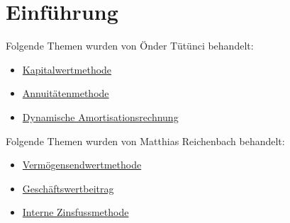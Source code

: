 \chapter{Einführung}
\label{Einfuehrung}

Folgende Themen wurden von Önder Tütünci behandelt:

\begin{itemize}
    \item \hyperref[Kapitalwertmethode]{Kapitalwertmethode}
    \item \hyperref[Annuitaetenmethode]{Annuitätenmethode}
    \item \hyperref[Dynamische Amortisationsrechnung]{Dynamische Amortisationsrechnung}
\end{itemize}
Folgende Themen wurden von Matthias Reichenbach behandelt:

\begin{itemize}
    \item \hyperref[Vermoegensendwertmethode]{Vermögensendwertmethode}
    \item \hyperref[Geschaeftswertbeitrag]{Geschäftswertbeitrag}
    \item \hyperref[Interne Zinsfussmethode]{Interne Zinsfussmethode}
\end{itemize}
